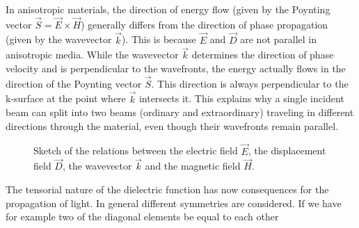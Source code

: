 \documentclass[
  a4paper,
]{book}
\begin{document}
\begin{tcolorbox}[enhanced jigsaw, coltitle=black, title=\textcolor{quarto-callout-important-color}{\faExclamation}\hspace{0.5em}{Energy Flow in Anisotropic Materials}, colframe=quarto-callout-important-color-frame, toprule=.15mm, opacitybacktitle=0.6, left=2mm, opacityback=0, breakable, toptitle=1mm, bottomtitle=1mm, leftrule=.75mm, arc=.35mm, titlerule=0mm, colbacktitle=quarto-callout-important-color!10!white, rightrule=.15mm, bottomrule=.15mm, colback=white]

In anisotropic materials, the direction of energy flow (given by the
Poynting vector \(\vec{S}=\vec{E}\times\vec{H}\)) generally differs from
the direction of phase propagation (given by the wavevector
\(\vec{k}\)). This is because \(\vec{E}\) and \(\vec{D}\) are not
parallel in anisotropic media. While the wavevector \(\vec{k}\)
determines the direction of phase velocity and is perpendicular to the
wavefronts, the energy actually flows in the direction of the Poynting
vector \(\vec{S}\). This direction is always perpendicular to the
k-surface at the point where \(\vec{k}\) intersects it. This explains
why a single incident beam can split into two beams (ordinary and
extraordinary) traveling in different directions through the material,
even though their wavefronts remain parallel.

\end{tcolorbox}

\begin{figure}


\caption{\label{fig-fields}Sketch of the relations between the electric
field \(\vec{E}\), the displacement field \(\vec{D}\), the wavevector
\(\vec{k}\) and the magnetic field \(\vec{H}\).}

\end{figure}%

The tensorial nature of the dielectric function has now consequences for
the propagation of light. In general different symmetries are
considered. If we have for example two of the diagonal elements be equal
to each other
\end{document}
